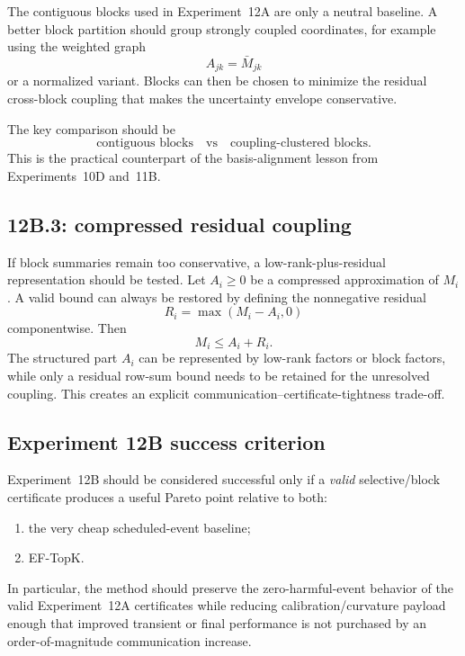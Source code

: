The contiguous blocks used in Experiment~12A are only a neutral baseline. A better block partition should group strongly coupled coordinates, for example using the weighted graph
\begin{equation}
  A_{jk}=\bar M_{jk}
\end{equation}
or a normalized variant. Blocks can then be chosen to minimize the residual cross-block coupling that makes the uncertainty envelope conservative.

The key comparison should be
\begin{equation}
  \text{contiguous blocks}
  \quad\text{vs}\quad
  \text{coupling-clustered blocks}.
\end{equation}
This is the practical counterpart of the basis-alignment lesson from Experiments~10D and~11B.

\subsection{12B.3: compressed residual coupling}

If block summaries remain too conservative, a low-rank-plus-residual representation should be tested. Let $A_i\geq0$ be a compressed approximation of $M_i$. A valid bound can always be restored by defining the nonnegative residual
\begin{equation}
  R_i=\max(M_i-A_i,0)
\end{equation}
componentwise. Then
\begin{equation}
  M_i\leq A_i+R_i.
\end{equation}
The structured part $A_i$ can be represented by low-rank factors or block factors, while only a residual row-sum bound needs to be retained for the unresolved coupling. This creates an explicit communication--certificate-tightness trade-off.

\subsection{Experiment 12B success criterion}

Experiment~12B should be considered successful only if a \emph{valid} selective/block certificate produces a useful Pareto point relative to both:
\begin{enumerate}
  \item the very cheap scheduled-event baseline;
  \item EF-TopK.
\end{enumerate}
In particular, the method should preserve the zero-harmful-event behavior of the valid Experiment~12A certificates while reducing calibration/curvature payload enough that improved transient or final performance is not purchased by an order-of-magnitude communication increase.

